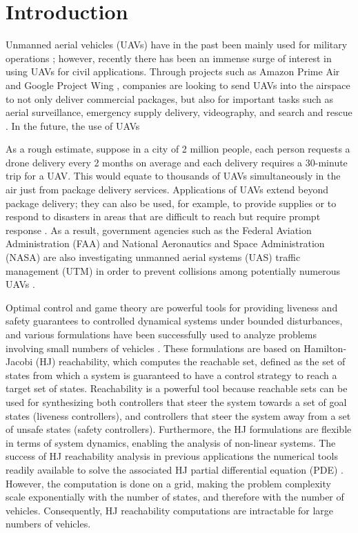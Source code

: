 \section{Introduction}
Unmanned aerial vehicles (UAVs) have in the past been mainly used for military operations \cite{Tice91}; however, recently there has been an immense surge of interest in using UAVs for civil applications. Through projects such as Amazon Prime Air \cite{PrimeAir} and Google Project Wing \cite{ProjectWing}, companies are looking to send UAVs into the airspace to not only deliver commercial packages, but also for important tasks such as aerial surveillance, emergency supply delivery, videography, and search and rescue \cite{Kopardekar16}. In the future, the use of UAVs 

As a rough estimate, suppose in a city of 2 million people, each person requests a drone delivery every 2 months on average and each delivery requires a 30-minute trip for a UAV. This would equate to thousands of UAVs simultaneously in the air just from package delivery services. Applications of UAVs extend beyond package delivery; they can also be used, for example, to provide supplies or to respond to disasters in areas that are difficult to reach but require prompt response \cite{Debusk10,Tornado16}. As a result, government agencies such as the Federal Aviation Administration (FAA) and National Aeronautics and Space Administration (NASA) are also investigating unmanned aerial systems (UAS) traffic management (UTM) in order to prevent collisions among potentially numerous UAVs \cite{Kopardekar16, FAA13, NASA16}. 

Optimal control and game theory are powerful tools for providing liveness and safety guarantees to controlled dynamical systems under bounded disturbances, and various formulations \cite{Bokanowski10, Mitchell05, Barron89} have been successfully used to analyze problems involving small numbers of vehicles \cite{Fisac15, Chen14, Chen17, Ding08}. These formulations are based on Hamilton-Jacobi (HJ) reachability, which computes the reachable set, defined as the set of states from which a system is guaranteed to have a control strategy to reach a target set of states. Reachability is a powerful tool because reachable sets can be used for synthesizing both controllers that steer the system towards a set of goal states (liveness controllers), and controllers that steer the system away from a set of unsafe states (safety controllers). Furthermore, the HJ formulations are flexible in terms of system dynamics, enabling the analysis of non-linear systems. The success of HJ reachability analysis in previous applications  the numerical tools readily available to solve the associated HJ partial differential equation (PDE) \cite{LSToolbox, Osher02, Sethian96}. However, the computation is done on a grid, making the problem complexity scale exponentially with the number of states, and therefore with the number of vehicles. Consequently, HJ reachability computations are intractable for large numbers of vehicles. 

